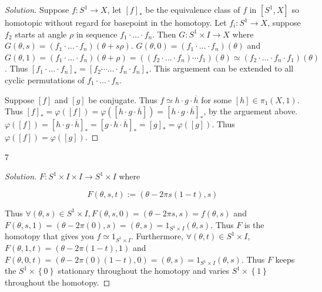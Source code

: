 \documentclass{article}
\newcommand*{\x}{\times}
\newenvironment{solution}
{\renewcommand\qedsymbol{$\blacksquare$}\begin{proof}[Solution]}
{\end{proof}}
\begin{document}
\begin{solution}
    Suppose $f: S^1 \to X$, let $[f]_*$ be the equivalence class of $f$ in $[S^1, X]$ so homotopic without regard for basepoint in the homotopy. Let $f_i : S^1 \to X$, suppose $f_2$ starts at angle $\rho$ in sequence $f_1 \cdot \hdots \cdot f_n$. Then $G : S^1 \times I \to X$ where $G(\theta, s) = (f_1 \cdot \hdots \cdot f_n)(\theta + s \rho)$. $G(\theta, 0) = (f_1 \cdot \hdots \cdot f_n)(\theta)$ and $G(\theta, 1) = (f_1 \cdot \hdots \cdot f_n)(\theta + \rho) = ((f_2 \cdot \hdots \cdot f_n) \cdots f_1)(\theta) \simeq (f_2 \cdot \dots \cdot f_n \cdot f_1)(\theta)$. Thus $[f_1 \cdot \hdots \cdot f_n]_* = [f_2 \cdots \hdots \cdot f_n \cdot f_n]_*$. This arguement can be extended to all cyclic permutations of $f_1 \cdot \hdots \cdot f_n$.                   
    
    Suppose $[f]$ and $[g]$ be conjugate. Thus $f \simeq h \cdot g \cdot \overline{h}$ for some $[h] \in \pi_1(X, 1)$. Thus $[f]_* = \varphi([f]) = \varphi([h \cdot g \cdot \overline{h}]) = [h \cdot g \cdot \overline{h}]_*$, by the arguement above. $\varphi([f]) = [h \cdot g \cdot \overline{h}]_* = [g \cdot h \cdot \overline{h}]_* = [g]_* = \varphi([g])$. Thus $\varphi([f]) = \varphi([g])$.     
\end{solution}

\begin{PROB}{7}\label{Problem 7.}
    
\end{PROB}
\begin{solution}
    $F : S^1 \times I \times I \to S^1 \times I$ where 
    
    \[F(\theta, s, t) := (\theta - 2 \pi s (1 - t), s)\]

    Thus $\forall (\theta, s) \in S^1 \x I, F(\theta, s, 0) = (\theta - 2\pi s, s) = f(\theta, s)$ and $F(\theta, s, 1) = (\theta - 2 \pi (0) ,s) = (\theta, s) = 1_{S^1 \times I}(\theta, s)$. Thus $F$ is the homotopy that gives you $f \simeq 1_{S^1 \times I}$.   Furthermore, $\forall (\theta, t) \in S^1 \times I$, $F(\theta, 1, t) = (\theta - 2\pi(1 - t), 1)$ and $F(\theta, 0, t) = (\theta - 2 \pi (0) (1 - t), 0) = (\theta, s) = 1_{S^1 \times I}(\theta, s)$. Thus $F$ keeps the $S^1 \times \left\{ 0 \right\}$ stationary throughout the homotopy and varies $S^1 \times \left\{ 1 \right\}$ throughout the homotopy.        
\end{solution}

\bigskip
\end{document}
